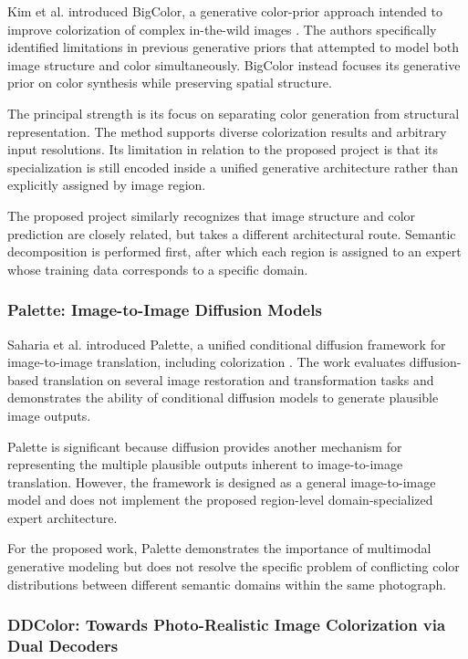 \documentclass{FastFyp}
\begin{document}
Kim et al. introduced BigColor, a generative color-prior approach intended to improve colorization of complex in-the-wild images \cite{ref7}. The authors specifically identified limitations in previous generative priors that attempted to model both image structure and color simultaneously. BigColor instead focuses its generative prior on color synthesis while preserving spatial structure.

The principal strength is its focus on separating color generation from structural representation. The method supports diverse colorization results and arbitrary input resolutions. Its limitation in relation to the proposed project is that its specialization is still encoded inside a unified generative architecture rather than explicitly assigned by image region.

The proposed project similarly recognizes that image structure and color prediction are closely related, but takes a different architectural route. Semantic decomposition is performed first, after which each region is assigned to an expert whose training data corresponds to a specific domain.

\subsubsection{Palette: Image-to-Image Diffusion Models}

Saharia et al. introduced Palette, a unified conditional diffusion framework for image-to-image translation, including colorization \cite{ref8}. The work evaluates diffusion-based translation on several image restoration and transformation tasks and demonstrates the ability of conditional diffusion models to generate plausible image outputs.

Palette is significant because diffusion provides another mechanism for representing the multiple plausible outputs inherent to image-to-image translation. However, the framework is designed as a general image-to-image model and does not implement the proposed region-level domain-specialized expert architecture.

For the proposed work, Palette demonstrates the importance of multimodal generative modeling but does not resolve the specific problem of conflicting color distributions between different semantic domains within the same photograph.

\subsubsection{DDColor: Towards Photo-Realistic Image Colorization via Dual Decoders}
\end{document}

